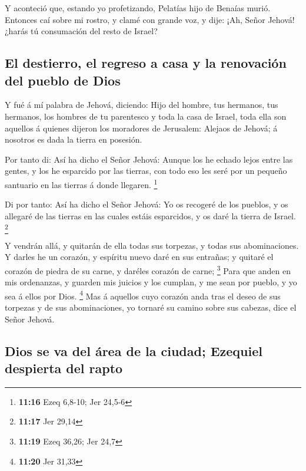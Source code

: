  Y aconteció que, estando yo profetizando, Pelatías hijo
de Benaías murió. Entonces caí sobre mi rostro, y clamé con grande voz,
y dije: ¡Ah, Señor Jehová! ¿harás tú consumación del resto de Israel?

\hypertarget{el-destierro-el-regreso-a-casa-y-la-renovaciuxf3n-del-pueblo-de-dios}{%
\subsection{El destierro, el regreso a casa y la renovación del pueblo
de
Dios}\label{el-destierro-el-regreso-a-casa-y-la-renovaciuxf3n-del-pueblo-de-dios}}

 Y fué á mí palabra de Jehová, diciendo: 
Hijo del hombre, tus hermanos, tus hermanos, los hombres de tu
parentesco y toda la casa de Israel, toda ella son aquellos á quienes
dijeron los moradores de Jerusalem: Alejaos de Jehová; á nosotros es
dada la tierra en posesión.

 Por tanto di: Así ha dicho el Señor Jehová: Aunque los
he echado lejos entre las gentes, y los he esparcido por las tierras,
con todo eso les seré por un pequeño santuario en las tierras á donde
llegaren. \footnote{\textbf{11:16} Ezeq 6,8-10; Jer 24,5-6}

 Di por tanto: Así ha dicho el Señor Jehová: Yo os
recogeré de los pueblos, y os allegaré de las tierras en las cuales
estáis esparcidos, y os daré la tierra de Israel. \footnote{\textbf{11:17}
  Jer 29,14}

 Y vendrán allá, y quitarán de ella todas sus torpezas, y
todas sus abominaciones.  Y darles he un corazón, y
espíritu nuevo daré en sus entrañas; y quitaré el corazón de piedra de
su carne, y daréles corazón de carne; \footnote{\textbf{11:19} Ezeq
  36,26; Jer 24,7}  Para que anden en mis ordenanzas, y
guarden mis juicios y los cumplan, y me sean por pueblo, y yo sea á
ellos por Dios. \footnote{\textbf{11:20} Jer 31,33}  Mas
á aquellos cuyo corazón anda tras el deseo de sus torpezas y de sus
abominaciones, yo tornaré su camino sobre sus cabezas, dice el Señor
Jehová.

\hypertarget{dios-se-va-del-uxe1rea-de-la-ciudad-ezequiel-despierta-del-rapto}{%
\subsection{Dios se va del área de la ciudad; Ezequiel despierta del
rapto}\label{dios-se-va-del-uxe1rea-de-la-ciudad-ezequiel-despierta-del-rapto}}

